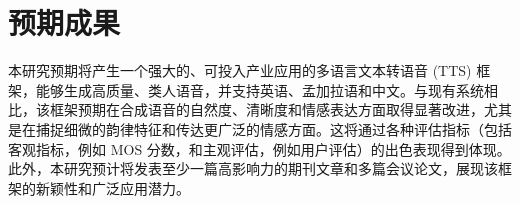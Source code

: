 \section*{预期成果}

本研究预期将产生一个强大的、可投入产业应用的多语言文本转语音 (TTS) 框架，能够生成高质量、类人语音，并支持英语、孟加拉语和中文。与现有系统相比，该框架预期在合成语音的自然度、清晰度和情感表达方面取得显著改进，尤其是在捕捉细微的韵律特征和传达更广泛的情感方面。这将通过各种评估指标（包括客观指标，例如 MOS 分数，和主观评估，例如用户评估）的出色表现得到体现。此外，本研究预计将发表至少一篇高影响力的期刊文章和多篇会议论文，展现该框架的新颖性和广泛应用潜力。